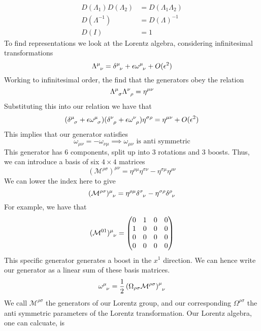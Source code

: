 \begin{align*}
	D ( \Lambda _ 1 ) D ( \Lambda _ 2) & = D ( \Lambda _  1 \Lambda _ 2 ) \\
	D ( \Lambda ^{ - 1} ) &= D ( \Lambda ) ^{ - 1} \\
	D ( I ) &= 1 
\end{align*} To find representations 
we look at the Lorentz algebra, considering infinitesimal transformations
\[
 \Lambda \indices{ ^ \mu _ \nu } = \delta \indices{ ^ \mu _ \nu } + 
 \epsilon \omega \indices{ ^ \mu _ \nu } + O ( \epsilon ^ 2 )  
\] Working to infinitesimal order, the find that 
the generators obey the relation 
\[
	\Lambda \indices{ ^ \mu _ \sigma  } \Lambda \indices{ ^ \nu _  \rho }  =  \eta ^{ \mu \nu }
\]  Substituting this into our relation we have that 
\[
	( \delta \indices{ ^ \mu _ \sigma } + \epsilon \omega \indices{ ^ \mu _ \sigma } ) ( 
	\delta \indices{ ^ \nu  _ \rho }   + \epsilon \omega \indices{ ^ \nu  _ \rho }  ) \eta ^{ \sigma \rho }  =
	\eta ^{ \mu \nu } + O ( \epsilon ^ 2 ) 
\]  This implies that our generator satisfies 
\[
 \omega _{ \mu \nu } = - \omega _{ \nu \mu } \implies 
 \omega _{  \mu \nu } \text{ is anti symmetric}
\] This generator has $ 6 $ components, split up into 
3 rotations and 3 boosts. Thus, we can introduce a basis of 
six $ 4 \times 4 $ matrices 
\[
	( \mathcal{ M } ^{ \rho \sigma } ) ^{ \mu \nu }  = \eta ^{ \rho \mu } \eta ^{ \sigma \nu } 
	- \eta ^{ \sigma \mu } \eta ^{ \rho \nu }
\] We can lower the index here to give 
\[
	( \mathcal{ M } ^{ \rho \sigma } ) \indices{ ^ \mu _ \nu } = 
	\eta ^{ \rho \mu } \delta \indices{ ^ \sigma  _ \nu }  - 
	\eta ^{ \sigma \rho } \delta \indices{ ^ \rho _ \nu } 
\]  For example, we have that 
\[
	( \mathcal{ M } ^{ 01  } ) \indices{ ^ \mu_ \nu } = 
	\begin{pmatrix}  0 & 1 & 0 & 0 \\ 
	1 & 0 & 0 & 0 \\
        0 & 0 & 0 & 0 \\ 0 & 0 & 0 & 0 \end{pmatrix} 
\] This specific generator generates a boost in the $x ^ 1 $ 
direction. We can hence write our generator as 
a linear sum of these basis matrices. 
\[
	\omega \indices{ ^ \mu _ \nu } = \frac{1}{2 } \left(  \Omega_{ \rho \sigma } \mathcal{ M } ^{ \rho \sigma } \right)
	\indices{ ^ \mu _ \nu } 
\]  We call $ \mathcal{ M }^{ \rho\sigma } $ the generators 
of our Lorentz group, and our corresponding $ \Omega ^{ \rho\sigma } $ 
the anti symmetric parameters of the Lorentz transformation.  
Our Lorentz algebra, one can calcuate, is 
